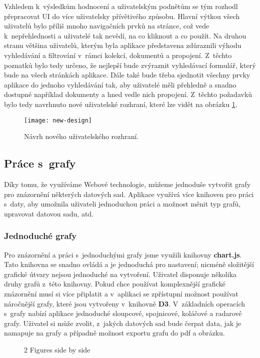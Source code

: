 \par Vzhledem k~výsledkům hodnocení a uživatelským podnětům se tým rozhodl přepracovat UI do více uživatelsky přívětivého způsobu. Hlavní výtkou všech uživatelů bylo příliš mnoho navigačních prvků na stránce, což vede k~nepřehlednosti a uživatelé tak nevědí, na co kliknout a co použít. Na druhou stranu většina uživatelů, kterým byla aplikace představena zdůraznili výhodu vyhledávání a filtrování v~rámci kolekcí, dokumentů a propojení. Z~těchto poznatků bylo tedy určeno, že nejlepší bude zvýraznit vyhledávací formulář, který bude na všech stránkách aplikace. Dále také bude třeba sjednotit všechny prvky aplikace do jednoho vyhledávání tak, aby uživatelé měli přehledně a snadno dostupné například dokumenty a hned vedle nich propojení. Z~těchto požadavků bylo tedy navrhnuto nové uživatelské rozhraní, které lze vidět na obrázku \ref{new-ui}.

\begin{figure}[htp]
\centering
\texttt{[image: new-design]}
\caption{Návrh nového uživatelského rozhraní.}
\label{new-ui}
\end{figure}

\subsection{Práce s~grafy}
\par Díky tomu, že využíváme Webové technologie, můžeme jednoduše vytvořit grafy pro znázornění některých datových sad. Aplikace využívá více knihoven pro práci s~daty, aby umožnila uživateli jednoduchou práci a možnost měnit typ grafů, upravovat datovou sadu, atd.

\subsubsection{Jednoduché grafy}
\par Pro znázornění a práci s~jednoduchými grafy jsme využili knihovny \textbf{chart.js}. Tato knihovna se snadno ovládá a je jednoduchá pro nastavení; nicméně složitější grafické útvary nejsou jednoduché na vytvoření. Uživatel disponuje několika druhy grafů z~této knihovny. Pokud chce používat komplexnější grafické znázornění musí si více připlatit a v~aplikaci se zpřístupní možnost používat náročnější grafy, které jsou vytvořeny v~knihovně \textbf{D3}. V~základních operacích s~grafy nabízí aplikace jednoduché sloupcové, spojnicové, koláčové a radarové grafy. Uživatel si může zvolit, z~jakých datových sad bude čerpat data, jak je namapuje na grafy a případně možnost exportu grafu do pdf a obrázku.
\begin{figure}[!htb]
\centering
{}%
%
%
\caption{2 Figures side by side}%
\label{fig:example}%
\end{figure}

